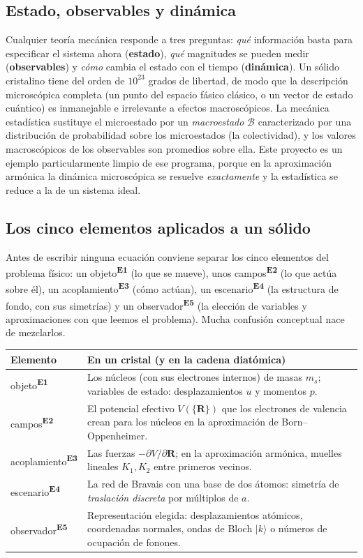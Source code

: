 \documentclass[11pt,a4paper]{article}
\newcommand{\Eobj}{objeto\textsuperscript{\textcolor{eobj}{\textbf{E1}}}}
\newcommand{\Ecams}{campos\textsuperscript{\textcolor{ecam}{\textbf{E2}}}}
\newcommand{\Eaco}{acoplamiento\textsuperscript{\textcolor{eaco}{\textbf{E3}}}}
\newcommand{\Eesc}{escenario\textsuperscript{\textcolor{eesc}{\textbf{E4}}}}
\newcommand{\Eobs}{observador\textsuperscript{\textcolor{eobs}{\textbf{E5}}}}
\begin{document}
\subsection{Estado, observables y dinámica}

Cualquier teoría mecánica responde a tres preguntas: \emph{qué} información
basta para especificar el sistema ahora (\textbf{estado}), \emph{qué}
magnitudes se pueden medir (\textbf{observables}) y \emph{cómo} cambia el
estado con el tiempo (\textbf{dinámica}). Un sólido cristalino tiene del orden de
$10^{23}$ grados de libertad, de modo que la descripción microscópica completa
(un punto del espacio fásico clásico, o un vector de estado cuántico) es
inmanejable e irrelevante a efectos macroscópicos. La mecánica estadística
sustituye el microestado por un \emph{macroestado} $\mathcal B$ caracterizado por
una distribución de probabilidad sobre los microestados (la colectividad), y los
valores macroscópicos de los observables son promedios sobre ella. Este
proyecto es un ejemplo particularmente limpio de ese programa, porque en la
aproximación armónica la dinámica microscópica se resuelve \emph{exactamente} y
la estadística se reduce a la de un sistema ideal.

\subsection{Los cinco elementos aplicados a un sólido}

Antes de escribir ninguna ecuación conviene separar los cinco elementos del
problema físico: un \Eobj{} (lo que se mueve), unos \Ecams{} (lo que
actúa sobre él), un \Eaco{} (cómo actúan), un \Eesc{} (la estructura de fondo,
con sus simetrías) y un \Eobs{} (la elección de variables y aproximaciones con
que leemos el problema). Mucha confusión conceptual nace de mezclarlos.

\begin{center}
\small
\begin{tabularx}{\textwidth}{@{}l X@{}}
\toprule
Elemento & En un cristal (y en la cadena diatómica)\\
\midrule
\Eobj & Los núcleos (con sus electrones internos) de masas $m_s$; variables de estado: desplazamientos $u$ y momentos $p$.\\
\Ecams & El potencial efectivo $V(\{\bm R\})$ que los electrones de valencia crean para los núcleos en la aproximación de Born–Oppenheimer.\\
\Eaco & Las fuerzas $-\partial V/\partial \bm R$; en la aproximación armónica, muelles lineales $K_1,K_2$ entre primeros vecinos.\\
\Eesc & La red de Bravais con una base de dos átomos: simetría de \emph{traslación discreta} por múltiplos de $a$.\\
\Eobs & Representación elegida: desplazamientos atómicos, coordenadas normales, ondas de Bloch $|k\rangle$ o números de ocupación de fonones.\\
\bottomrule
\end{tabularx}
\end{center}
\end{document}
